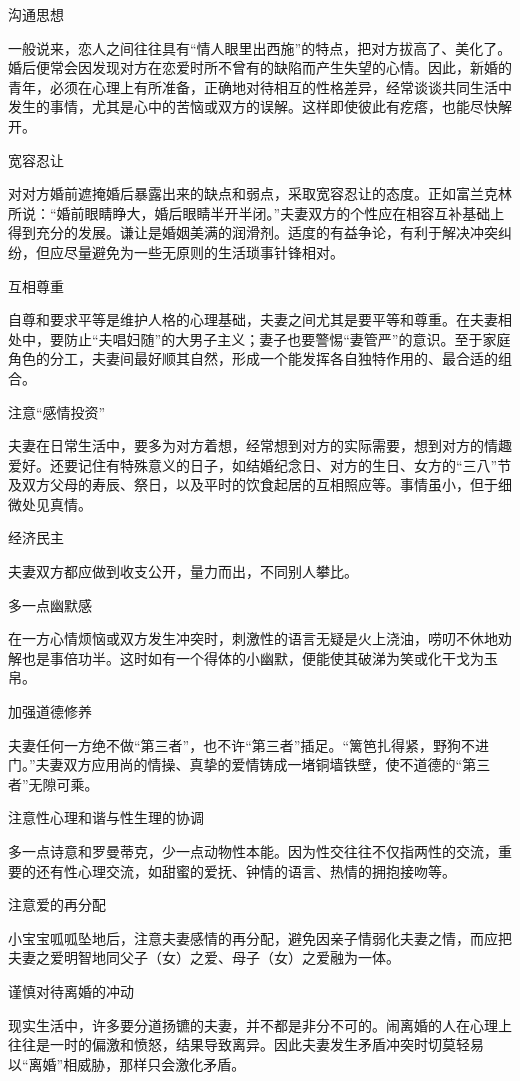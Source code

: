 \documentclass[12pt,UTF8]{ctexbook}
\begin{document}
沟通思想

一般说来，恋人之间往往具有“情人眼里出西施”的特点，把对方拔高了、美化了。婚后便常会因发现对方在恋爱时所不曾有的缺陷而产生失望的心情。因此，新婚的青年，必须在心理上有所准备，正确地对待相互的性格差异，经常谈谈共同生活中发生的事情，尤其是心中的苦恼或双方的误解。这样即使彼此有疙瘩，也能尽快解开。

宽容忍让

对对方婚前遮掩婚后暴露出来的缺点和弱点，采取宽容忍让的态度。正如富兰克林所说：“婚前眼睛睁大，婚后眼睛半开半闭。”夫妻双方的个性应在相容互补基础上得到充分的发展。谦让是婚姻美满的润滑剂。适度的有益争论，有利于解决冲突纠纷，但应尽量避免为一些无原则的生活琐事针锋相对。

互相尊重

自尊和要求平等是维护人格的心理基础，夫妻之间尤其是要平等和尊重。在夫妻相处中，要防止“夫唱妇随”的大男子主义；妻子也要警惕“妻管严”的意识。至于家庭角色的分工，夫妻间最好顺其自然，形成一个能发挥各自独特作用的、最合适的组合。

注意“感情投资”

夫妻在日常生活中，要多为对方着想，经常想到对方的实际需要，想到对方的情趣爱好。还要记住有特殊意义的日子，如结婚纪念日、对方的生日、女方的“三八”节及双方父母的寿辰、祭日，以及平时的饮食起居的互相照应等。事情虽小，但于细微处见真情。

经济民主

夫妻双方都应做到收支公开，量力而出，不同别人攀比。

多一点幽默感

在一方心情烦恼或双方发生冲突时，刺激性的语言无疑是火上浇油，唠叨不休地劝解也是事倍功半。这时如有一个得体的小幽默，便能使其破涕为笑或化干戈为玉帛。

加强道德修养

夫妻任何一方绝不做“第三者”，也不许“第三者”插足。“篱笆扎得紧，野狗不进门。”夫妻双方应用尚的情操、真挚的爱情铸成一堵铜墙铁壁，使不道德的“第三者”无隙可乘。

注意性心理和谐与性生理的协调

多一点诗意和罗曼蒂克，少一点动物性本能。因为性交往往不仅指两性的交流，重要的还有性心理交流，如甜蜜的爱抚、钟情的语言、热情的拥抱接吻等。

注意爱的再分配

小宝宝呱呱坠地后，注意夫妻感情的再分配，避免因亲子情弱化夫妻之情，而应把夫妻之爱明智地同父子（女）之爱、母子（女）之爱融为一体。

谨慎对待离婚的冲动

现实生活中，许多要分道扬镳的夫妻，并不都是非分不可的。闹离婚的人在心理上往往是一时的偏激和愤怒，结果导致离异。因此夫妻发生矛盾冲突时切莫轻易以“离婚”相威胁，那样只会激化矛盾。
\end{document}
